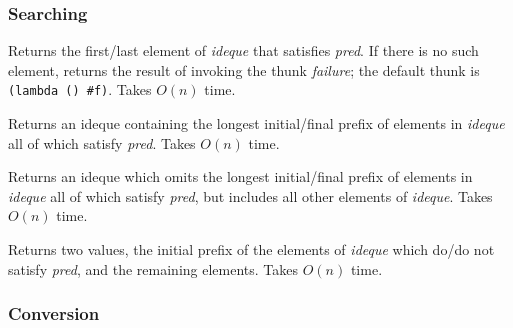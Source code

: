 \subsubsection{Searching}

\begin{entry}{%
  }

  Returns the first/last element of \emph{ideque} that satisfies
  \emph{pred}. If there is no such element, returns the result of
  invoking the thunk \emph{failure}; the default thunk is
  \texttt{(lambda\ ()\ \#f)}. Takes $O(n)$ time.
\end{entry}

\begin{entry}{%
  }

  Returns an ideque containing the longest initial/final prefix of
  elements in \emph{ideque} all of which satisfy \emph{pred}. Takes
  $O(n)$ time.
\end{entry}

\begin{entry}{%
  }

  Returns an ideque which omits the longest initial/final prefix of
  elements in \emph{ideque} all of which satisfy \emph{pred}, but
  includes all other elements of \emph{ideque}. Takes $O(n)$ time.
\end{entry}

\begin{entry}{%
  }

  Returns two values, the initial prefix of the elements of
  \emph{ideque} which do/do not satisfy \emph{pred}, and the remaining
  elements. Takes $O(n)$ time.

\end{entry}

\subsubsection{Conversion}


